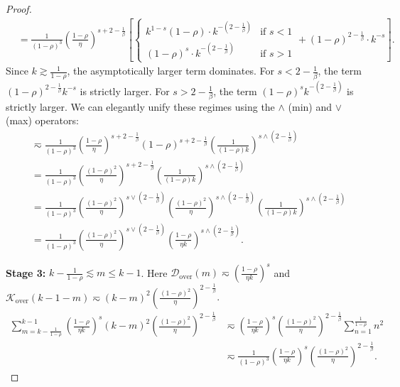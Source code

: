 \begin{proof}
\begin{align*}
    &= \frac{1}{(1-\rho)^3} \left( \frac{1-\rho}{\eta} \right)^{s+2-\frac{1}{\beta}} \left[ \begin{cases} k^{1-s} (1-\rho) \cdot k^{-\left(2-\frac{1}{\beta}\right)} & \text{if } s < 1 \\ (1-\rho)^s \cdot k^{-\left(2-\frac{1}{\beta}\right)} & \text{if } s > 1 \end{cases} + (1-\rho)^{2-\frac{1}{\beta}} \cdot k^{-s} \right].
\end{align*}
Since $k \gtrsim \frac{1}{1-\rho}$, the asymptotically larger term dominates. For $s < 2-\frac{1}{\beta}$, the term $(1-\rho)^{2-\frac{1}{\beta}} k^{-s}$ is strictly larger. For $s > 2-\frac{1}{\beta}$, the term $(1-\rho)^s k^{-(2-\frac{1}{\beta})}$ is strictly larger. We can elegantly unify these regimes using the $\wedge$ (min) and $\vee$ (max) operators:
\begin{align*}
    &\eqsim \frac{1}{(1-\rho)^3} \left( \frac{1-\rho}{\eta} \right)^{s+2-\frac{1}{\beta}} (1-\rho)^{s+2-\frac{1}{\beta}} \left( \frac{1}{(1-\rho)k} \right)^{s \wedge \left(2-\frac{1}{\beta}\right)} \\
    &= \frac{1}{(1-\rho)^3} \left( \frac{(1-\rho)^2}{\eta} \right)^{s+2-\frac{1}{\beta}} \left( \frac{1}{(1-\rho)k} \right)^{s \wedge \left(2-\frac{1}{\beta}\right)} \\
    &= \frac{1}{(1-\rho)^3} \left( \frac{(1-\rho)^2}{\eta} \right)^{s \vee \left(2-\frac{1}{\beta}\right)} \left(\frac{(1-\rho)^2}{\eta}\right)^{s \wedge \left(2-\frac{1}{\beta}\right)} \left( \frac{1}{(1-\rho)k} \right)^{s \wedge \left(2-\frac{1}{\beta}\right)} \\
    &= \frac{1}{(1-\rho)^3} \left( \frac{(1-\rho)^2}{\eta} \right)^{s \vee \left(2-\frac{1}{\beta}\right)} \left( \frac{1-\rho}{\eta k} \right)^{s \wedge \left(2-\frac{1}{\beta}\right)}.
\end{align*}

\textbf{Stage 3:} $k - \frac{1}{1-\rho} \lesssim m \le k-1$. Here $\mathcal{D}_{\mathrm{over}}(m) \eqsim \left(\frac{1-\rho}{\eta k}\right)^s$ and $\mathcal{K}_{\mathrm{over}}(k-1-m) \eqsim (k-m)^2 \left(\frac{(1-\rho)^2}{\eta}\right)^{2-\frac{1}{\beta}}$.
\begin{align*}
    \sum_{m=k-\frac{1}{1-\rho}}^{k-1} \left(\frac{1-\rho}{\eta k}\right)^s (k-m)^2 \left(\frac{(1-\rho)^2}{\eta}\right)^{2-\frac{1}{\beta}} &\eqsim \left(\frac{1-\rho}{\eta k}\right)^s \left(\frac{(1-\rho)^2}{\eta}\right)^{2-\frac{1}{\beta}} \sum_{n=1}^{\frac{1}{1-\rho}} n^2 \\
    &\eqsim \frac{1}{(1-\rho)^3} \left(\frac{1-\rho}{\eta k}\right)^s \left(\frac{(1-\rho)^2}{\eta}\right)^{2-\frac{1}{\beta}}.
\end{align*}


\end{proof}
